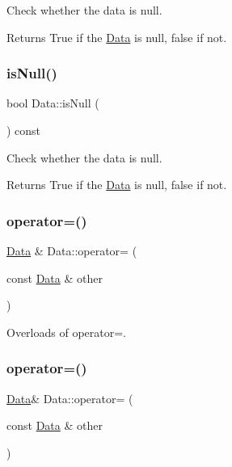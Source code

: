 Check whether the data is null.

\begin{DoxyReturn}{Returns}
True if the \hyperlink{classData}{Data} is null, false if not. 
\end{DoxyReturn}
\mbox{\label{classData_af0c867ee0a1b0916ce50e9966cd252ef}} 
\subsubsection{\texorpdfstring{is\+Null()}{isNull()}\hspace{0.1cm}{\footnotesize\ttfamily [2/2]}}
{\footnotesize\ttfamily bool Data\+::is\+Null (\begin{DoxyParamCaption}{ }\end{DoxyParamCaption}) const}

Check whether the data is null.

\begin{DoxyReturn}{Returns}
True if the \hyperlink{classData}{Data} is null, false if not. 
\end{DoxyReturn}
\mbox{\label{classData_ac5e314c7b80a4a7fcecb4c7cb0b40783}} 
\subsubsection{\texorpdfstring{operator=()}{operator=()}\hspace{0.1cm}{\footnotesize\ttfamily [1/4]}}
{\footnotesize\ttfamily \hyperlink{classData}{Data} \& Data\+::operator= (\begin{DoxyParamCaption}\item[{const \hyperlink{classData}{Data} \&}]{other }\end{DoxyParamCaption})}

Overloads of operator=. \mbox{\label{classData_ad8e70b509933d1594c823ddb69bfaeaa}} 
\subsubsection{\texorpdfstring{operator=()}{operator=()}\hspace{0.1cm}{\footnotesize\ttfamily [2/4]}}
{\footnotesize\ttfamily \hyperlink{classData}{Data}\& Data\+::operator= (\begin{DoxyParamCaption}\item[{const \hyperlink{classData}{Data} \&}]{other }\end{DoxyParamCaption})}

